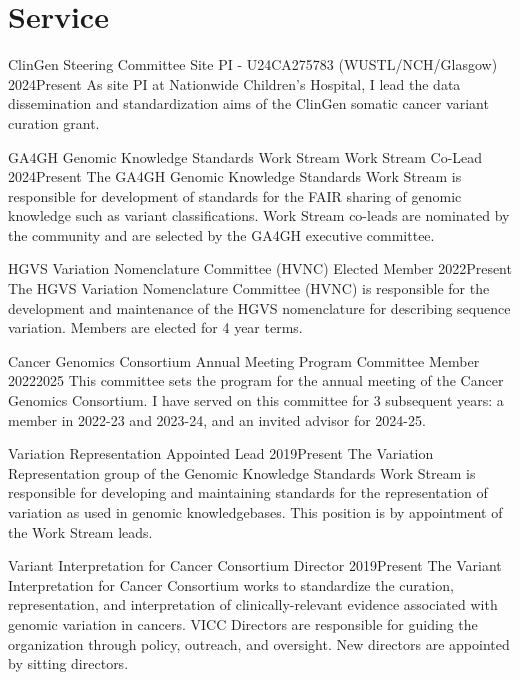 \documentclass[10pt]{article} %
\begin{document}

\section{Service}

\cmte
{ClinGen Steering Committee}
{Site PI - U24CA275783 (WUSTL/NCH/Glasgow)}
{2024}{Present}
{As site PI at Nationwide Children's Hospital, I lead the data dissemination and standardization 
aims of the ClinGen somatic cancer variant curation grant.}

\cmte
{GA4GH Genomic Knowledge Standards Work Stream}
{Work Stream Co-Lead}
{2024}{Present}
{The GA4GH Genomic Knowledge Standards Work Stream is responsible for development of standards for the 
FAIR sharing of genomic knowledge such as variant classifications. Work Stream co-leads are nominated by the
community and are selected by the GA4GH executive committee.}

\cmte
{HGVS Variation Nomenclature Committee (HVNC)}
{Elected Member}
{2022}{Present}
{The HGVS Variation Nomenclature Committee (HVNC) is responsible for the development
and maintenance of the HGVS nomenclature for describing sequence variation.
Members are elected for 4 year terms.}

 \cmte
{Cancer Genomics Consortium Annual Meeting Program Committee}
{Member}
{2022}{2025}
{This committee sets the program for the annual meeting of the Cancer Genomics Consortium. I have served on this
committee for 3 subsequent years: a member in 2022-23 and 2023-24, and an invited advisor for 2024-25.}

\cmte
{Variation Representation}
{Appointed Lead}
{2019}{Present}
{The Variation Representation group of the Genomic Knowledge Standards Work Stream is
 responsible for developing and maintaining standards for the representation of variation as used
 in genomic knowledgebases. This position is by appointment of the Work Stream leads.}

\cmte
{Variant Interpretation for Cancer Consortium}
{Director}
{2019}{Present}
{The Variant Interpretation for Cancer Consortium works to standardize the curation, 
representation, and interpretation of clinically-relevant evidence associated with genomic variation
 in cancers. VICC Directors are responsible for guiding the organization through policy, outreach, and
 oversight. New directors are appointed by sitting directors.}
 
\end{document}
